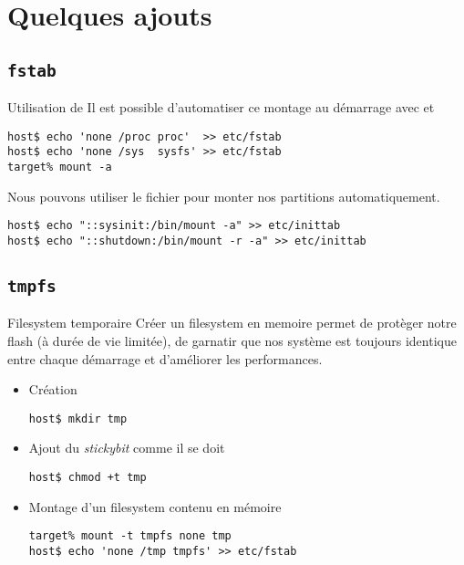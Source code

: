 \section{Quelques ajouts}

\subsection{\texttt{fstab}}

\begin{frame}[fragile=singleslide]{Utilisation de }
  Il  est   possible  d'automatiser  ce  montage   au  démarrage  avec
   et 
  \begin{lstlisting}
host$ echo 'none /proc proc'  >> etc/fstab
host$ echo 'none /sys  sysfs' >> etc/fstab
target% mount -a
  \end{lstlisting}

  Nous pouvons utiliser le  fichier  pour monter nos
  partitions automatiquement.
  \begin{lstlisting}
host$ echo "::sysinit:/bin/mount -a" >> etc/inittab
host$ echo "::shutdown:/bin/mount -r -a" >> etc/inittab
  \end{lstlisting}
\end{frame}

\subsection{\texttt{tmpfs}}

\begin{frame}[fragile=singleslide]{Filesystem temporaire}
  Créer un  filesystem en  memoire permet de  protèger notre  flash (à
  durée  de vie  limitée), de  garnatir que  nos système  est toujours
  identique entre chaque démarrage et d'améliorer les performances.
  \begin{itemize}
    \item Création
    \begin{lstlisting}
host$ mkdir tmp
    \end{lstlisting}
  \item Ajout du \emph{stickybit} comme il se doit
    \begin{lstlisting}
host$ chmod +t tmp
    \end{lstlisting}
  \item Montage d'un filesystem contenu en mémoire
    \begin{lstlisting}
target% mount -t tmpfs none tmp
host$ echo 'none /tmp tmpfs' >> etc/fstab
    \end{lstlisting}
  \end{itemize}
\end{frame}

